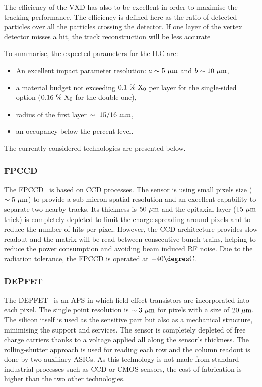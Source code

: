    The efficiency of the \gls{VXD} has also to be excellent in order to maximise the tracking performance.
   The efficiency is defined here as the ratio of detected particles over all the particles crossing the detector.
   If one layer of the vertex detector misses a hit, the track reconstruction will be less accurate 
   
   To summarise, the expected parameters for the \gls{ILC} are: 
   \begin{itemize}
     \item An excellent impact parameter resolution: $a \sim 5~\rm{\mu m}$ and $b \sim 10~\rm{\mu m}$,
     \item a material budget not exceeding $0.1~\%~\rm{X_0}$ per layer for the single-sided option ($0.16~\%~\rm{X_0}$ for the double one),
     \item radius of the first layer $\sim~15/16~\rm{mm}$,
     \item an occupancy below the percent level.
   \end{itemize}

   The currently considered technologies are presented below. 
    
   \subsubsection{FPCCD}
   
     The \gls{FPCCD}~\cite{CalanchaParedes} is based on \gls{CCD} processes.
     The sensor is using small pixels size ($\sim 5~\rm{\mu m}$) to provide a sub-micron spatial resolution and an excellent capability to separate two nearby tracks.
     Its thickness is $50~\rm{\mu m}$ and the epitaxial layer ($15~\rm{\mu m}$ thick) is completely depleted to limit the charge spreading around pixels and to reduce the number of hits per pixel.
     However, the \gls{CCD} architecture provides slow readout and the matrix will be read between consecutive bunch trains, helping to reduce the power consumption and avoiding beam induced RF noise.
     Due to the radiation tolerance, the \gls{FPCCD} is operated at $-40 \degres \rm{C}$.

   \subsubsection{DEPFET}
    
    The \gls{DEPFET}~\cite{Richter2003} is an \gls{APS} in which field effect transistors are incorporated into each pixel.
    The single point resolution is $\sim 3~\rm{\mu m}$ for pixels with a size of $20~\rm{\mu m}$.
    The silicon itself is used as the sensitive part but also as a mechanical structure, minimising the support and services.
    The sensor is completely depleted of free charge carriers thanks to a voltage applied all along the sensor's thickness.
    The rolling-shutter approach is used for reading each row and the column readout is done by two auxiliary \glspl{ASIC}.
    As this technology is not made from standard industrial processes such as \gls{CCD} or \gls{CMOS} sensors, the cost of fabrication is higher than the two other technologies.

